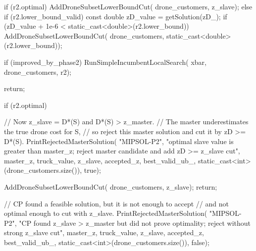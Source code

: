{{{{{{                        if (r2.optimal)
                        {
                            AddDroneSubsetLowerBoundCut(
                                drone_customers,
                                z_slave);
                        }
                        else if (r2.lower_bound_valid)
                        {
                            const double zD_value = getSolution(zD_);
                            if (zD_value + 1e-6 < static_cast<double>(r2.lower_bound))
                            {
                                AddDroneSubsetLowerBoundCut(
                                    drone_customers,
                                    static_cast<double>(r2.lower_bound));
                            }
                        }

                        if (improved_by_phase2)
                        {
                            RunSimpleIncumbentLocalSearch(
                                xbar,
                                drone_customers,
                                r2);
                        }

                        return;
                    }

                    if (r2.optimal)
                    {
                        // Now z_slave = D*(S) and D*(S) > z_master.
                        // The master underestimates the true drone cost for S,
                        // so reject this master solution and cut it by zD >= D*(S).
                        PrintRejectedMasterSolution(
                            "MIPSOL-P2",
                            "optimal slave value is greater than master_z; reject master candidate and add zD >= z_slave cut",
                            master_z,
                            truck_value,
                            z_slave,
                            accepted_z,
                            best_valid_ub_,
                            static_cast<int>(drone_customers.size()),
                            true);

                        AddDroneSubsetLowerBoundCut(
                            drone_customers,
                            z_slave);
                        return;
                    }

                    // CP found a feasible solution, but it is not enough to accept
                    // and not optimal enough to cut with z_slave.
                    PrintRejectedMasterSolution(
                        "MIPSOL-P2",
                        "CP found z_slave > z_master but did not prove optimality; reject without strong z_slave cut",
                        master_z,
                        truck_value,
                        z_slave,
                        accepted_z,
                        best_valid_ub_,
                        static_cast<int>(drone_customers.size()),
                        false);

}}}}}
